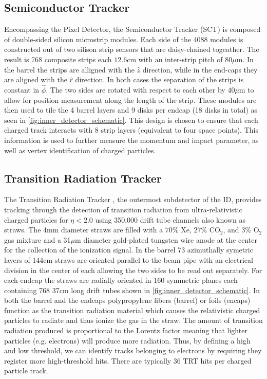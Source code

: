 \subsection{Semiconductor Tracker}

Encompassing the Pixel Detector, the Semiconductor Tracker (SCT)
\cite{PERF-2007-01} is composed of double-sided silicon microstrip modules.
Each side of the 4088 modules is constructed out of two silison strip sensors
that are daisy-chained togeather.  The result is 768 composite strips each
$12.6$cm with an inter-strip pitch of $80 \mu$m. In the barrel the strips are
alligned with the $\hat{z}$ direction, while in the end-caps they are aligned
with the $\hat{r}$ direction. In both cases the separation of the strips is
constant in $\hat{\phi}$. The two sides are rotated with respect to each other
by $40 \mu$m to allow for position measurement along the length of the strip.
These modules are then used to tile the 4 barrel layers and 9 disks per endcap
(18 disks in total) as seen in \cref{fig:inner_detector_schematic}.  This
design is chosen to ensure that each charged track interacts with 8 strip
layers (equivalent to four space points).  This information is used to further
measure the momentum and impact parameter, as well as vertex identification of
charged particles.

\subsection{Transition Radiation Tracker}

The Transition Radiation Tracker \cite{PERF-2007-01}, the outermost subdetector
of the ID, provides tracking through the detection of transition radiation from
ultra-relativistic charged particles for $\eta < 2.0$ using 350,000 drift tube
channels also known as straws.  The 4mm diameter straws are filled with a $70\%$
Xe, $27\%$ CO$_2$, and $3\%$ O$_2$ gas mixture and a 31$\mu$m diameter
gold-plated tungsten wire anode at the center for the collection of the
ionization signal. In the barrel 73 azimuthally symetric layers of 144cm straws
are oriented parallel to the beam pipe with an electrical division in the center
of each allowing the two sides to be read out separately.  For each endcap the
straws are radially oriented in 160 symmetric planes each containing 768 37cm
long drift tubes shown in \cref{fig:inner_detector_schematic}.  In both
the barrel and the endcaps polypropylene fibers (barrel) or foils (encaps)
function as the transition radiation material which causes the relativistic
charged particles to radiate and thus ionize the gas in the straw.  The amount
of transition radiation produced is proportional to the Lorentz factor meaning
that lighter particles (e.g. electrons) will produce more radiation.  Thus, by
defining a high and low threshold, we can identify tracks belonging to electrons
by requiring they register more high-threshold hits. There are typically 36 TRT
hits per charged particle track. 
